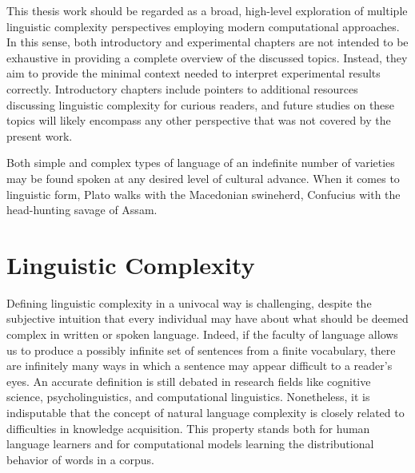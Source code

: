 \documentclass[a4paper, nobind]{templates/ociamthesis}
\begin{document}
This thesis work should be regarded as a broad, high-level exploration of multiple linguistic complexity perspectives employing modern computational approaches. In this sense, both introductory and experimental chapters are not intended to be exhaustive in providing a complete overview of the discussed topics. Instead, they aim to provide the minimal context needed to interpret experimental results correctly. Introductory chapters include pointers to additional resources discussing linguistic complexity for curious readers, and future studies on these topics will likely encompass any other perspective that was not covered by the present work.

\begin{savequote}
Both simple and complex types of language of an indefinite number of
varieties may be found spoken at any desired level of cultural advance.
When it comes to linguistic form, Plato walks with the Macedonian
swineherd, Confucius with the head-hunting savage of Assam.
\end{savequote}



\titlespacing*{\chapter}{0pt}{80px}{35pt}

\hypertarget{chap:ling-comp}{%
\chapter{\texorpdfstring{\textbf{Linguistic Complexity}}{Linguistic Complexity}}\label{chap:ling-comp}}

\minitoc  


Defining linguistic complexity in a univocal way is challenging, despite the subjective intuition that every individual may have about what should be deemed complex in written or spoken language. Indeed, if the faculty of language allows us to produce a possibly infinite set of sentences from a finite vocabulary, there are infinitely many ways in which a sentence may appear difficult to a reader's eyes. An accurate definition is still debated in research fields like cognitive science, psycholinguistics, and computational linguistics. Nonetheless, it is indisputable that the concept of natural language complexity is closely related to difficulties in knowledge acquisition. This property stands both for human language learners and for computational models learning the distributional behavior of words in a corpus.
\end{document}
